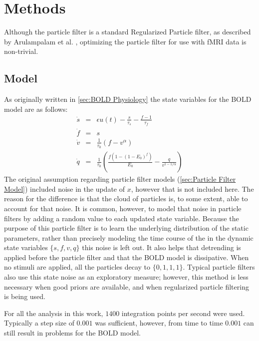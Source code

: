 \chapter{Methods}
\label{sec:Methods}
Although the particle filter  is a standard Regularized
Particle filter, as described by Arulampalam et al.
 \cite{Arulampalam2002a}, optimizing the
particle filter for use with \ac{fMRI} data is non-trivial.

\section{Model}
As originally written in \autoref{sec:BOLD Physiology} the state variables
for the \ac{BOLD} model are as follows:
\begin{eqnarray}
\dot{s} &=& \epsilon u(t) - \frac{s}{\tau_s} - \frac{f - 1}{\tau_f} \\
\dot{f} &=& s\\
\dot{v} &=& \frac{1}{\tau_0}(f - v^\alpha)\\
\dot{q} &=& \frac{1}{\tau_0}(\frac{f(1-(1-E_0)^f)}{E_0} - \frac{q}{v^{1-1/\alpha}})
\end{eqnarray}
The original assumption regarding particle filter models (\autoref{sec:Particle Filter Model})
included noise in the update of $x$, however that is not included here.
The reason for the difference is that the cloud of particles is, to some extent,
able to account for that noise. It is common, however, to model that noise
in particle filters by adding a random value to each updated state variable.
Because the purpose of this particle filter is to learn the underlying distribution
of the static parameters, rather than precisely modeling the time course of the
in the dynamic state variables $\{s,f,v,q\}$ this noise is left out. It also helps
that detrending is applied before the particle filter and that the
\ac{BOLD} model is dissipative. When no stimuli are applied, all the particles
decay to $\{0,1,1,1\}$. Typical particle filters
also use this state noise as an exploratory measure; however, this method is
less necessary when good priors are available, and when regularized particle filtering
is being used.

For all the analysis  in this work, $1400$ integration points
per second were used.  Typically a step size of $0.001$ was sufficient,
however, from time to time $0.001$ can still result in problems for the
\ac{BOLD} model.

